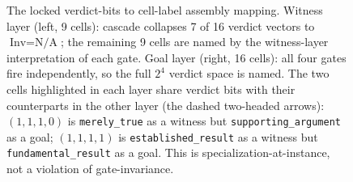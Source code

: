 \begin{figure}[t]
\caption{The locked verdict-bits to cell-label assembly mapping. Witness layer
(left, 9 cells): cascade collapses 7 of 16 verdict vectors to $\text{Inv}=\text{N/A}$;
the remaining 9 cells are named by the witness-layer interpretation of each
gate. Goal layer (right, 16 cells): all four gates fire independently, so
the full $2^4$ verdict space is named.
The two cells highlighted in each layer share verdict bits with their counterparts
in the other layer (the dashed two-headed arrows): $(1,1,1,0)$ is
\texttt{merely\_true} as a witness but \texttt{supporting\_argument} as a goal;
$(1,1,1,1)$ is \texttt{established\_result} as a witness but
\texttt{fundamental\_result} as a goal. This is specialization-at-instance,
not a violation of gate-invariance.}
\label{fig:cell_taxonomy}
\end{figure}

